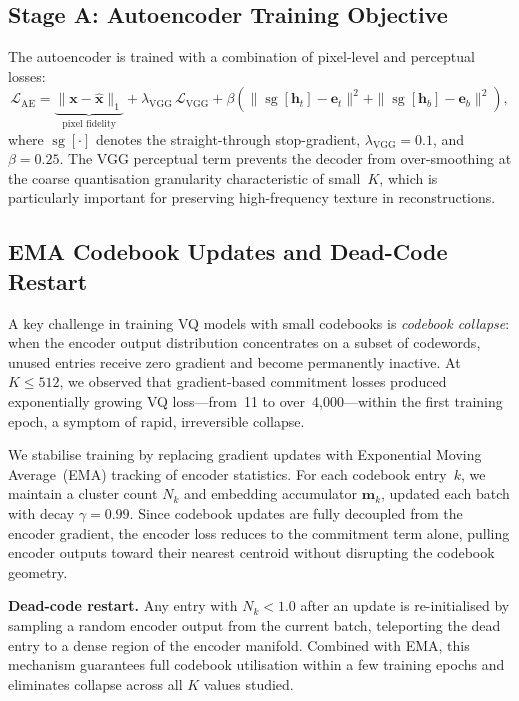 \documentclass[sigconf, screen, review, anonymous]{acmart}
\begin{document}
\subsection{Stage A: Autoencoder Training Objective}
The autoencoder is trained with a combination of pixel-level and
perceptual losses:
\begin{equation}
  \mathcal{L}_\text{AE}
    = \underbrace{\|\mathbf{x} - \hat{\mathbf{x}}\|_1}_{\text{pixel fidelity}}
    + \lambda_\text{VGG}\,\mathcal{L}_\text{VGG}
    + \beta\!\left(
        \|\operatorname{sg}[\mathbf{h}_t] - \mathbf{e}_t\|^2
      + \|\operatorname{sg}[\mathbf{h}_b] - \mathbf{e}_b\|^2
      \right),
  \label{eq:lae}
\end{equation}
where $\operatorname{sg}[\cdot]$ denotes the straight-through
stop-gradient, $\lambda_\text{VGG}{=}0.1$, and $\beta{=}0.25$.
The VGG perceptual term prevents the decoder from over-smoothing at
the coarse quantisation granularity characteristic of small~$K$,
which is particularly important for preserving high-frequency texture
in reconstructions.

\subsection{EMA Codebook Updates and Dead-Code Restart}
\label{sec:ema}

A key challenge in training VQ models with small codebooks is
\emph{codebook collapse}: when the encoder output distribution
concentrates on a subset of codewords, unused entries receive zero
gradient and become permanently inactive. At $K \leq 512$, we observed
that gradient-based commitment losses produced exponentially growing VQ
loss---from~11 to over~4{,}000---within the first training epoch, a
symptom of rapid, irreversible collapse.

We stabilise training by replacing gradient updates with Exponential
Moving Average~(EMA) tracking of encoder statistics. For each codebook
entry~$k$, we maintain a cluster count $N_k$ and embedding accumulator
$\mathbf{m}_k$, updated each batch with decay $\gamma{=}0.99$. Since
codebook updates are fully decoupled from the encoder gradient, the
encoder loss reduces to the commitment term alone, pulling encoder
outputs toward their nearest centroid without disrupting the codebook
geometry.

\noindent\textbf{Dead-code restart.} Any entry with $N_k < 1.0$ after
an update is re-initialised by sampling a random encoder output from
the current batch, teleporting the dead entry to a dense region of the
encoder manifold. Combined with EMA, this mechanism guarantees full
codebook utilisation within a few training epochs and eliminates
collapse across all $K$ values studied.
\end{document}

